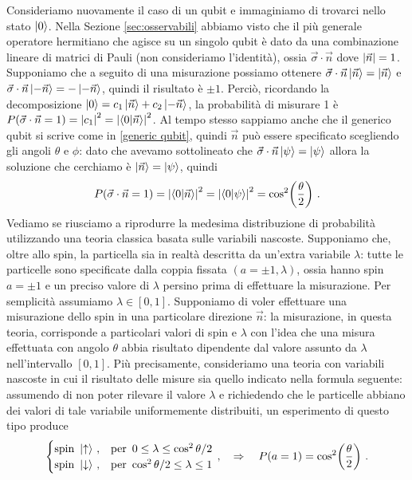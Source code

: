 \begin{esempio}
    Consideriamo nuovamente il caso di un qubit e immaginiamo di trovarci nello stato $\ket{0}$. Nella Sezione \ref{sec:osservabili} abbiamo visto che il più generale operatore hermitiano che agisce su un singolo qubit è dato da una combinazione lineare di matrici di Pauli (non consideriamo l'identità), ossia $\vec{\sigma} \cdot \vec{n}$ dove $\abs{\vec{n}} = 1$. Supponiamo che a seguito di una misurazione possiamo ottenere $\vec{\sigma} \cdot \vec{n} \ket{\vec{n}} = \ket{\vec{n}}$ e $\vec{\sigma} \cdot \vec{n} \ket{-\vec{n}} = - \ket{-\vec{n}}$, quindi il risultato è $\pm 1$. Perciò, ricordando la decomposizione $\ket{0} = c_1 \ket{\vec{n}} + c_2 \ket{-\vec{n}}$, la probabilità di misurare 1 è $P(\vec{\sigma} \cdot \vec{n} = 1) = \abs{c_1}^2 = \abs{\braket{0}{\vec{n}}}^2$. Al tempo stesso sappiamo anche che il generico qubit si scrive come in \eqref{generic qubit}, quindi $\vec{n}$ può essere specificato scegliendo gli angoli $\theta$ e $\phi$: dato che avevamo sottolineato che $\vec{\sigma} \cdot \vec{n} \ket{\psi} = \ket{\psi}$ allora la soluzione che cerchiamo è $\ket{\vec{n}} = \ket{\psi}$, quindi
    \begin{equation*}
        P(\vec{\sigma} \cdot \vec{n} = 1) = \abs{\braket{0}{\vec{n}}}^2 = \abs{\braket{0}{\psi}}^2 = \cos^2 \! \left( \frac{\theta}{2} \right) \, .
    \end{equation*}
    Vediamo se riusciamo a riprodurre la medesima distribuzione di probabilità utilizzando una teoria classica basata sulle variabili nascoste. Supponiamo che, oltre allo spin, la particella sia in realtà descritta da un'extra variabile $\lambda$: tutte le particelle sono specificate dalla coppia fissata $(a = \pm 1, \lambda)$, ossia hanno spin $a = \pm 1$ e un preciso valore di $\lambda$ persino prima di effettuare la misurazione. Per semplicità assumiamo $\lambda \in [0,1]$. Supponiamo di voler effettuare una misurazione dello spin in una particolare direzione $\vec{n}$: la misurazione, in questa teoria, corrisponde a particolari valori di spin e $\lambda$ con l'idea che una misura effettuata con angolo $\theta$ abbia risultato dipendente dal valore assunto da $\lambda$ nell'intervallo $[0,1]$. Più precisamente, consideriamo una teoria con variabili nascoste in cui  il risultato delle misure sia quello indicato nella formula seguente: assumendo di non poter rilevare il valore $\lambda$ e richiedendo che le particelle abbiano dei valori di tale variabile uniformemente distribuiti, un esperimento di questo tipo produce 
    \begin{equation*}
        \begin{cases}
            \text{spin }\ket{\uparrow} \, , & \text{per} \, \, \, 0 \leq \lambda \leq \cos^2 \theta/2 \\
            \text{spin }\ket{\downarrow} \, , &\text{per} \,\,  \cos^2 \theta/2 \leq \lambda \leq 1
        \end{cases} \, , \quad \Rightarrow \quad P(a = 1) = \cos^2 \! \left( \frac{\theta}{2} \right) \, .
    \end{equation*}
\end{esempio}

